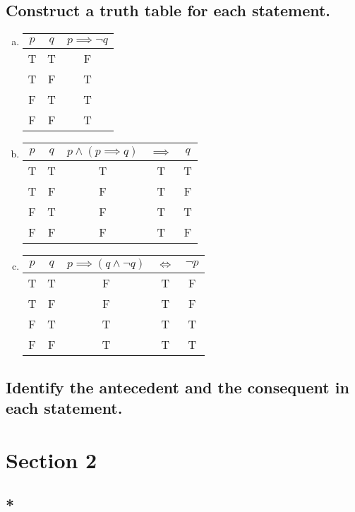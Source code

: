 \documentclass[12pt]{scrartcl} %
\begin{document}
\subsection{Construct a truth table for each statement.}
\begin{enumerate}[(a)]
	\item 
		\begin{tabular}{*{2}{c}|*{1}{c}}$p$&$q$&$p \implies \neg q$\\
		\hline
		T&T&F\\
		T&F&T\\
		F&T&T\\
		F&F&T\\
		\end{tabular}
	\item
		\begin{tabular}{*{2}{c}|*{3}{c}}$p$&$q$&$p \land (p \implies q)$&$\implies$&$q$\\
		\hline
		T&T&T&T&T\\
		T&F&F&T&F\\
		F&T&F&T&T\\
		F&F&F&T&F\\
		\end{tabular}
		
	\item
		\begin{tabular}{*{2}{c}|*{3}{c}}$p$&$q$&$p \implies (q \land \neg q)$&$\iff$&$\neg p$\\
		\hline
		T&T&F&T&F\\
		T&F&F&T&F\\
		F&T&T&T&T\\
		F&F&T&T&T\\
		\end{tabular}
\end{enumerate}

\subsection{Identify the antecedent and the consequent in each statement.}

\section{Section 2}

\subsection{*}
\end{document}
